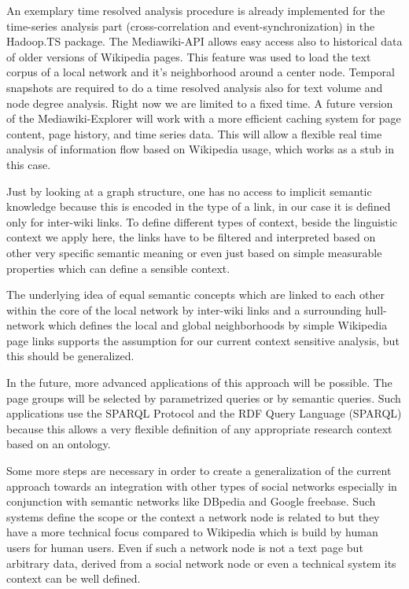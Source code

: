 \documentclass[a4paper,10pt]{scrbook}
\begin{document}
An exemplary time resolved analysis procedure is already implemented for the
time-series analysis part (cross-correlation and event-synchronization) in the
Hadoop.TS package. The Mediawiki-API allows easy access also to historical data
of older versions of Wikipedia pages. This feature was used to load the text
corpus of a local network and it's neighborhood around a center node. Temporal
snapshots are required to do a time resolved analysis also for text volume and
node degree analysis. Right now we are limited to a fixed time. A future
version of the Mediawiki-Explorer will work with a more efficient caching
system for page content, page history, and time series data. This will allow a
flexible real time analysis of information flow based on Wikipedia usage, which
works as a stub in this case.

Just by looking at a graph structure, one has no access to implicit semantic
knowledge
because this is encoded in the type of a link, in our case it is defined
only for inter-wiki links. To define different types of context,
beside the linguistic context we apply here, the links have to be filtered
and interpreted based on other very specific semantic meaning or even just
based on simple measurable properties which can define a sensible context.

The underlying idea of equal semantic concepts which are linked to each other
within the core of the local network by inter-wiki links and a
surrounding hull-network which defines the local and global neighborhoods by
simple Wikipedia page links supports the assumption for our current context
sensitive analysis, but this should be generalized.

In the future, more advanced applications of this approach will be possible. The
page groups will be selected by parametrized queries or by semantic
queries. Such applications use the SPARQL Protocol
and the RDF Query Language (SPARQL) \cite{SPARQL} because this allows a
very flexible definition of any appropriate research context based on an
ontology.

Some more steps are necessary in order to create a generalization of the
current approach towards an integration with other types of social networks
especially in conjunction with semantic networks like DBpedia and Google
freebase. Such systems define the scope or the context a network node is related
to but they have a more technical focus compared to Wikipedia which is build by
human users for human users. Even if such a network node is not a text page
but arbitrary data, derived from a social network node or even a technical
system its context can be well defined.
\end{document}
